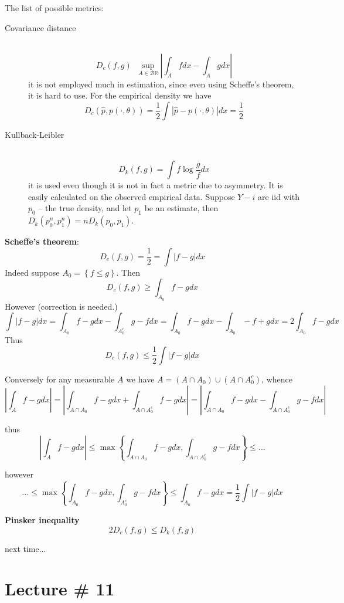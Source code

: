 \documentclass[a4paper]{article}
\newcommand{\obj}[1]{{\left\{ #1 \right \}}}
\newcommand{\abs}[1]{{\left | #1 \right |}}
\newcommand{\Real}{\mathbb{R}}
\newcommand{\borel}{\mathcal{B}}
\newcommand{\defn}{\mathop{\overset{\Delta}{=}}\nolimits}
\begin{document}
The list of possible metrics: \begin{description}
	\item[Covariance distance]\hfill \\
	\[D_c(f,g)\defn \sup_{A\in \borel{\Real}} \abs{\int_A f dx - \int_A g dx}\]
	it is not employed much in estimation, since even using Scheffe's theorem, it is hard to use.
	For the empirical density we have
	\[D_c(\hat{p}, p(\cdot,\theta)) = \frac{1}{2} \int \abs{\hat{p} - p(\cdot,\theta)}dx = \frac{1}{2}\]
	\item[Kullback-Leibler]\hfill \\
	\[D_k(f,g) = \int f \log \frac{g}{f} dx\]
	it is used even though it is not in fact a metric due to asymmetry.
	It is easily calculated on the observed empirical data.
	Suppose $Y-i$ are iid with $p_0$ -- the true density, and let $p_1$ be an estimate, then $D_k(p_0^n, p_1^n) = nD_k(p_0,p_1)$.

\end{description}

\noindent\textbf{Scheffe's theorem}:
\[D_c(f,g) = \frac{1}{2} = \int \abs{f-g}dx\]
Indeed suppose $A_0 = \obj{ f\leq g }$. Then
\[D_c(f,g)\geq \int_{A_0} f-g dx\]
However (correction is needed.)
\[\int \abs{f-g} dx = \int_{A_0} f-g dx - \int_{A_0^c} g-f dx = \int_{A_0} f-g dx  - \int_{A_0} -f+g dx = 2\int_{A_0} f-g dx \]
Thus 
\[D_c(f,g)\leq \frac{1}{2} \int \abs{f-g} dx \]

Conversely for any measurable $A$ we have $A = (A\cap A_0) \cup (A\cap A_0^c)$, whence
\[\abs{\int_A f-g dx} = \abs{\int_{A\cap A_0} f-g dx + \int_{A\cap A_0^c} f-g dx} = \abs{\int_{A\cap A_0} f-g dx - \int_{A\cap A_0^c} g-f dx}\]

thus 
\[\abs{\int_A f-g dx} \leq \max\obj{ \int_{A\cap A_0} f-g dx, \int_{A\cap A_0^c} g-f dx } \leq \ldots\]

however
\[\ldots \leq \max\obj{ \int_{A_0} f-g dx, \int_{A_0^c} g-f dx } \leq \int_{A_0} f-g dx  = \frac{1}{2}\int \abs{f-g} dx\]

\noindent\textbf{Pinsker inequality}\hfill \\
\[2 D_c(f,g) \leq D_k(f,g)\]

next time...



\section{Lecture \# 11} %
\label{sec:lecture_11}
\end{document}
